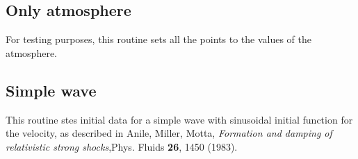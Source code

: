 \documentclass{article}
\begin{document}
%
%
%

\subsection{Only atmosphere}
\label{sec:only-atmo}

For testing purposes, this routine sets all the points to the values of the atmosphere.


\subsection{Simple wave}
\label{sec:simple-wave}

This routine stes initial data for a simple wave with sinusoidal initial function for the velocity,
as described in Anile, Miller, Motta, {\it Formation and damping of relativistic strong
  shocks},Phys. Fluids {\bf 26}, 1450 (1983).
\end{document}
